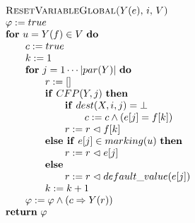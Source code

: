\begin{equation*}
\begin{tabular}{l}
\textsc{ResetVariableGlobal(}$Y(e)$, $i,$ $V$\textsc{)} \\ 
$\varphi :=true$ \\ 
\textbf{for} $u=Y(f)\in V$ \textbf{do} \\ 
$\qquad c:=true$ \\ 
$\qquad k:=1$ \\ 
$\qquad $\textbf{for} $j=1\cdots \left\vert par(Y)\right\vert $ \textbf{do}
\\ 
$\qquad \qquad r:=[]$ \\ 
$\qquad \qquad $\textbf{if} $CFP(Y,j)$ \textbf{then} \\ 
$\qquad \qquad \qquad $\textbf{if} $dest(X,i,j)=\bot $ \\ 
$\qquad \qquad \qquad \qquad c:=c\wedge (e[j]=f[k])$ \\ 
$\qquad \qquad \qquad r:=r\vartriangleleft f[k]$ \\ 
$\qquad \qquad $\textbf{else if} $e[j]\in marking(u)$ \textbf{then} \\ 
$\qquad \qquad \qquad r:=r\vartriangleleft e[j]$ \\ 
$\qquad \qquad $\textbf{else} \\ 
$\qquad \qquad \qquad r:=r\vartriangleleft default\_value(e[j])$ \\ 
$\qquad \qquad k:=k+1$ \\ 
$\qquad \varphi :=\varphi \wedge (c\Rightarrow Y(r))$ \\ 
\textbf{return} $\varphi $%
\end{tabular}%
\end{equation*}%
